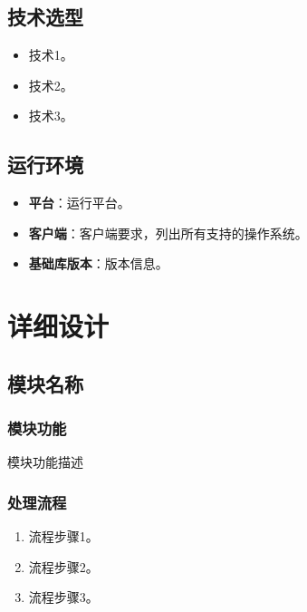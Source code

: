 \documentclass[a4paper,12pt]{article}
\begin{document}
\subsection{技术选型}

\begin{itemize}[leftmargin=2em]
  \item {{技术1}}。
  \item {{技术2}}。
  \item {{技术3}}。
\end{itemize}

\subsection{运行环境}

\begin{itemize}[leftmargin=2em]
  \item \textbf{平台}：{{运行平台}}。
  \item \textbf{客户端}：{{客户端要求，列出所有支持的操作系统}}。
  \item \textbf{基础库版本}：{{版本信息}}。
\end{itemize}


\section{详细设计}


\subsection{{{模块名称}}}

\subsubsection{模块功能}

{{模块功能描述}}

\subsubsection{处理流程}

\begin{enumerate}[leftmargin=2em]
  \item {{流程步骤1}}。
  \item {{流程步骤2}}。
  \item {{流程步骤3}}。
\end{enumerate}
\end{document}
